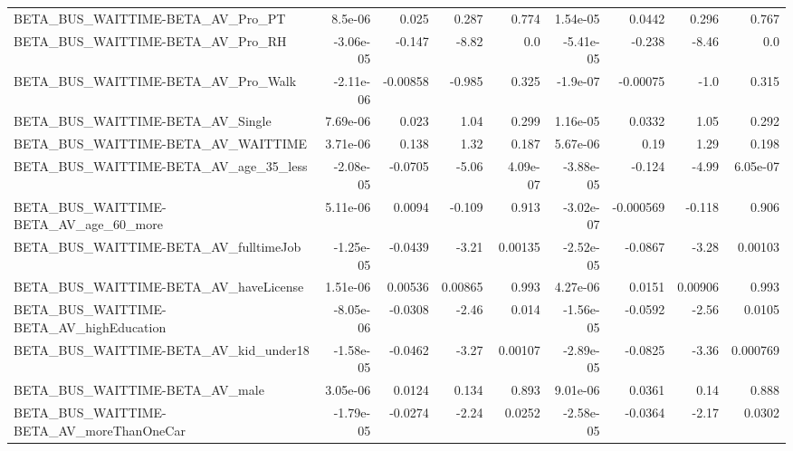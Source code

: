 \begin{tabular}{lrrrrrrrr}
BETA\_BUS\_WAITTIME-BETA\_AV\_Pro\_PT                   &     8.5e-06 &        0.025 &     0.287 &    0.774 &   1.54e-05 &      0.0442 &        0.296 &         0.767 \\
BETA\_BUS\_WAITTIME-BETA\_AV\_Pro\_RH                   &   -3.06e-05 &       -0.147 &     -8.82 &      0.0 &  -5.41e-05 &      -0.238 &        -8.46 &           0.0 \\
BETA\_BUS\_WAITTIME-BETA\_AV\_Pro\_Walk                 &   -2.11e-06 &     -0.00858 &    -0.985 &    0.325 &   -1.9e-07 &    -0.00075 &         -1.0 &         0.315 \\
BETA\_BUS\_WAITTIME-BETA\_AV\_Single                   &    7.69e-06 &        0.023 &      1.04 &    0.299 &   1.16e-05 &      0.0332 &         1.05 &         0.292 \\
BETA\_BUS\_WAITTIME-BETA\_AV\_WAITTIME                 &    3.71e-06 &        0.138 &      1.32 &    0.187 &   5.67e-06 &        0.19 &         1.29 &         0.198 \\
BETA\_BUS\_WAITTIME-BETA\_AV\_age\_35\_less              &   -2.08e-05 &      -0.0705 &     -5.06 & 4.09e-07 &  -3.88e-05 &      -0.124 &        -4.99 &      6.05e-07 \\
BETA\_BUS\_WAITTIME-BETA\_AV\_age\_60\_more              &    5.11e-06 &       0.0094 &    -0.109 &    0.913 &  -3.02e-07 &   -0.000569 &       -0.118 &         0.906 \\
BETA\_BUS\_WAITTIME-BETA\_AV\_fulltimeJob              &   -1.25e-05 &      -0.0439 &     -3.21 &  0.00135 &  -2.52e-05 &     -0.0867 &        -3.28 &       0.00103 \\
BETA\_BUS\_WAITTIME-BETA\_AV\_haveLicense              &    1.51e-06 &      0.00536 &   0.00865 &    0.993 &   4.27e-06 &      0.0151 &      0.00906 &         0.993 \\
BETA\_BUS\_WAITTIME-BETA\_AV\_highEducation            &   -8.05e-06 &      -0.0308 &     -2.46 &    0.014 &  -1.56e-05 &     -0.0592 &        -2.56 &        0.0105 \\
BETA\_BUS\_WAITTIME-BETA\_AV\_kid\_under18              &   -1.58e-05 &      -0.0462 &     -3.27 &  0.00107 &  -2.89e-05 &     -0.0825 &        -3.36 &      0.000769 \\
BETA\_BUS\_WAITTIME-BETA\_AV\_male                     &    3.05e-06 &       0.0124 &     0.134 &    0.893 &   9.01e-06 &      0.0361 &         0.14 &         0.888 \\
BETA\_BUS\_WAITTIME-BETA\_AV\_moreThanOneCar           &   -1.79e-05 &      -0.0274 &     -2.24 &   0.0252 &  -2.58e-05 &     -0.0364 &        -2.17 &        0.0302 \\

\end{tabular}
